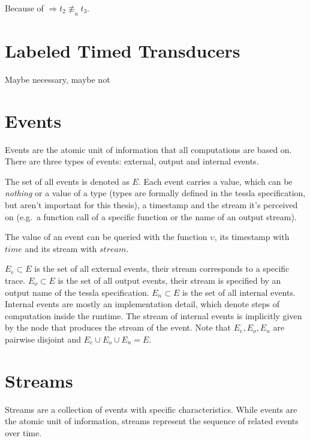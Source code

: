 \begin{exmp}[name=Observational Equivalence]
  Because of  \(\Rightarrow t_2 \not\equiv_a t_3\).

\end{exmp}

\section{Labeled Timed Transducers}
Maybe necessary, maybe not

\section{Events}
\label{sec:definitions:events}

Events are the atomic unit of information that all computations are based on.
There are three types of events: external, output and internal events.

The set of all events is denoted as \(E\).
Each event carries a value, which can be \emph{nothing} or a value of a type (types are formally defined in the \gls{tessla} specification, but aren't important for this thesis), a timestamp and the stream it's perceived on (e.g.\ a function call of a specific function or the name of an output stream).

The value of an event can be queried with the function \(\upsilon\), its timestamp with \(\mathit{time}\) and its stream with \(\mathit{stream}\).

\(E_e \subset E\) is the set of all external events, their stream corresponds to a specific trace.
\(E_o \subset E\) is the set of all output events, their stream is specified by an output name of the \gls{tessla} specification.
\(E_n \subset E\) is the set of all internal events.
Internal events are mostly an implementation detail, which denote steps of computation inside the runtime.
The stream of internal events is implicitly given by the node that produces the stream of the event.
Note that \(E_e, E_o, E_n\) are pairwise disjoint and \(E_e \cup E_o \cup E_n = E\).

\section{Streams}
\label{sec:definitions:streams}

Streams are a collection of events with specific characteristics.
While events are the atomic unit of information, streams represent the sequence of related events over time.

